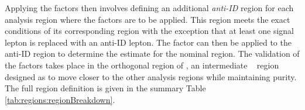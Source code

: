 Applying the \fake factors then involves defining an additional \emph{anti-ID} region for each analysis region where the \fake factors are to be applied.
This region meets the exact conditions of its corresponding region with the exception that at least one signal lepton is replaced with an anti-ID lepton.
The \fake factor can then be applied to the anti-ID region to determine the \fake estimate for the nominal region. 
The validation of the \fake factors takes place in the orthogonal region of \VRZj, an intermediate \met~ region designed as to move closer to the other analysis regions while maintaining \Zjets purity.
The full region definition is given in the summary Table \ref{tab:regions:regionBreakdown}.

